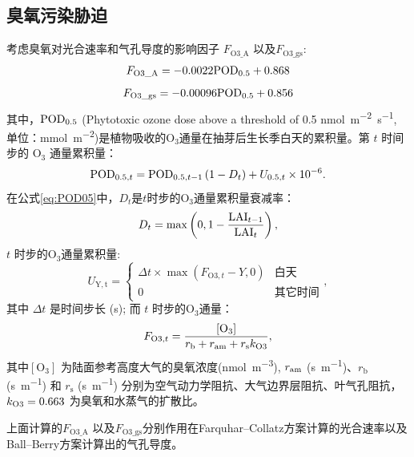 \subsection{臭氧污染胁迫}
考虑臭氧对光合速率和气孔导度的影响因子 $F_{\mathrm{O3\_A}}$ 以及$F_{\mathrm{O3\_{gs}}}$:
\begin{equation}
  F_{\mathrm{O3\_{A}}}=-0.0022 {\rm POD}_{\mathrm{0.5}}+0.868
\end{equation}
\begin{equation}
  F_{\mathrm{O3\_{gs}}}=-0.00096 {\rm POD}_{\mathrm{0.5}}+0.856
\end{equation}
其中，${\rm POD}_{0.5}$ (Phytotoxic ozone dose above a threshold of 0.5 \unit{nmol.m^{-2}.s^{-1}}, 单位：\unit{mmol.m^{-2}})是植物吸收的$\mathrm {O_3}$通量在抽芽后生长季白天的累积量。第 $t$ 时间步的 $\mathrm{O_3}$ 通量累积量：
\begin{equation}\label{eq:POD05}
  {\rm POD}_{0.5,t}={\rm POD}_{0.5,t-1}\left(1-D_t\right)+U_{0.5,t} \times 10^{-6}.
\end{equation}
在公式\eqref{eq:POD05}中，$D_t$是$t$时步的$\mathrm{O_3}$通量累积量衰减率：
\begin{equation}
  D_t = \max\left(0, 1-\frac{{\rm LAI}_{t-1}}{{\rm LAI}_t} \right),
\end{equation}
$t$ 时步的$\mathrm{O_3}$通量累积量:
\begin{equation}
  U_{\mathrm{Y,t}}=\begin{cases}
    \Delta t\times\max(F_{{\mathrm {O3}},t}-Y, 0) & \text{白天} \\
    0 & \text{其它时间}
  \end{cases},
\end{equation}
其中 $\Delta t$ 是时间步长 (s); 而 $t$ 时步的$\mathrm{O_3}$通量：
\begin{equation}
  F_{{\mathrm {O3}},t}=\frac{\mathrm{[O_3]}}{r_{\mathrm {b}}  + r_{\mathrm{am}} + r_{\mathrm s}k_{\rm O3}},
\end{equation}
其中$\mathrm{[O_3]}$ 为陆面参考高度大气的臭氧浓度(\unit{nmol.m^{-3}}), $r_{\rm am}$ (\unit{s.m^{-1}})、$r_{\mathrm {b}} $ (\unit{s.m^{-1}}) 和 $r_{\mathrm {s}} $ (\unit{s.m^{-1}}) 分别为空气动力学阻抗、大气边界层阻抗、叶气孔阻抗，$k_{\rm O3}=0.663$ 为臭氧和水蒸气的扩散比。

上面计算的$F_{\mathrm{{O3}\_A}}$ 以及$F_{\mathrm{O3\_{gs}}}$分别作用在Farquhar--Collatz方案计算的光合速率以及Ball--Berry方案计算出的气孔导度。

